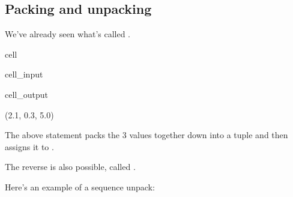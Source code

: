 \documentclass[letterpaper,10pt,english]{jupyterBook}
\begin{document}
\subsection{Packing and unpacking}
\label{\detokenize{datatypes:packing-and-unpacking}}
\sphinxAtStartPar
We’ve already seen what’s called .

\begin{sphinxuseclass}{cell}\begin{sphinxVerbatimInput}

\begin{sphinxuseclass}{cell_input}
\begin{sphinxVerbatim}[commandchars=\\\{\}]
    
\end{sphinxVerbatim}

\end{sphinxuseclass}\end{sphinxVerbatimInput}
\begin{sphinxVerbatimOutput}

\begin{sphinxuseclass}{cell_output}
\begin{sphinxVerbatim}[commandchars=\\\{\}]
(2.1, 0.3, \PYGZhy{}5.0)
\end{sphinxVerbatim}

\end{sphinxuseclass}\end{sphinxVerbatimOutput}

\end{sphinxuseclass}
\sphinxAtStartPar
The above statement packs the 3 values together down into a tuple and then assigns it to .

\sphinxAtStartPar
The reverse is also possible, called .

\sphinxAtStartPar
Here’s an example of a sequence unpack:
\end{document}
